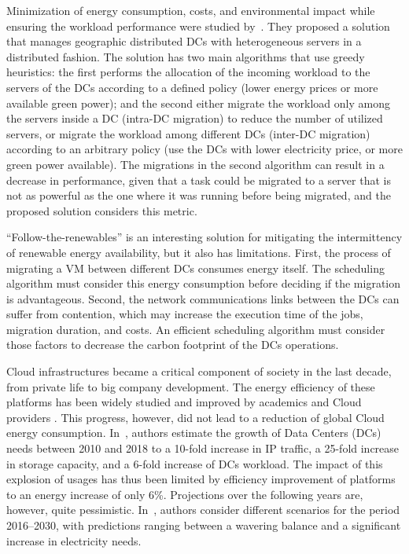 Minimization of energy consumption, costs, and environmental impact
while ensuring the workload performance were studied
by~\cite{ALI2021110907}. They proposed a solution that manages
geographic distributed DCs with heterogeneous servers in a distributed
fashion. The solution has two main algorithms that use greedy
heuristics: the first performs the allocation of the incoming workload
to the servers of the DCs according to a defined policy (lower energy
prices or more available green power); and the second either migrate
the workload only among the servers inside a DC (intra-DC migration)
to reduce the number of utilized servers, or migrate the workload
among different DCs (inter-DC migration) according to an arbitrary
policy (use the DCs with lower electricity price, or more green power
available). The migrations in the second algorithm can result in a
decrease in performance, given that a task could be migrated to a
server that is not as powerful as the one where it was running before
being migrated, and the proposed solution considers this metric.

``Follow-the-renewables'' is an interesting solution for mitigating
the intermittency of renewable energy availability, but it also has
limitations. First, the process of migrating a VM between different
DCs consumes energy itself. The scheduling algorithm must consider
this energy consumption before deciding if the migration is
advantageous. Second, the network communications links between the DCs
can suffer from contention, which may increase the execution time of
the jobs, migration duration, and costs. An efficient scheduling
algorithm must consider those factors to decrease the carbon footprint
of the DCs operations.

Cloud infrastructures became a critical component of society in the
last decade, from private life to big company development. The energy
efficiency of these platforms has been widely studied and improved by
academics and Cloud providers \cite{muralidhar2020energy}. This
progress, however, did not lead to a reduction of global Cloud energy
consumption. In~\cite{masanet2020recalibrating}, authors estimate the
growth of Data Centers (DCs) needs between 2010 and 2018 to a 10-fold
increase in IP traffic, a 25-fold increase in storage capacity, and a
6-fold increase of DCs workload. The impact of this explosion of
usages has thus been limited by efficiency improvement of platforms to
an energy increase of only 6\%. Projections over the following years
are, however, quite pessimistic. In~\cite{koot2021usage}, authors
consider different scenarios for the period 2016--2030, with
predictions ranging between a wavering balance and a significant
increase in electricity needs.



